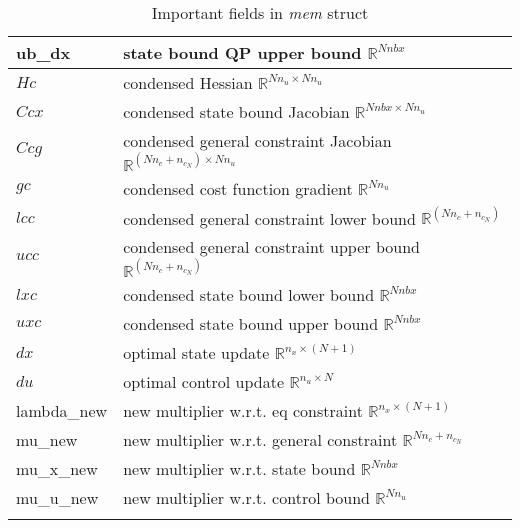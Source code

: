 \documentclass{article}
\newcommand{\alert}[1]{{\textit{#1}}}
\begin{document}
\begin{longtable}{l|l}
		ub\_dx & state bound QP upper bound     $\mathbb{R}^{Nnbx}$           \\\hline
		$Hc$ & condensed Hessian    $\mathbb{R}^{Nn_u\times Nn_u}$                     \\
		$Ccx$ & condensed state bound Jacobian  $\mathbb{R}^{Nnbx\times Nn_u}$          \\
		$Ccg$ & condensed general constraint Jacobian  $\mathbb{R}^{(Nn_c+n_{c_N})\times Nn_u}$    \\
		$gc$ & condensed cost function gradient  $\mathbb{R}^{Nn_u}$        \\
		$lcc$ & condensed general constraint lower bound $\mathbb{R}^{(Nn_c+n_{c_N})}$ \\
		$ucc$ & condensed general constraint upper bound $\mathbb{R}^{(Nn_c+n_{c_N})}$ \\
		$lxc$ & condensed state bound lower bound   $\mathbb{R}^{Nnbx}$      \\
		$uxc$ & condensed state bound upper bound   $\mathbb{R}^{Nnbx}$      \\\hline
		$dx$ & optimal state update     $\mathbb{R}^{n_x\times (N+1)}$                 \\
		$du$ & optimal control update   $\mathbb{R}^{n_u\times N}$                 \\
		lambda\_new & new multiplier w.r.t. eq constraint $\mathbb{R}^{n_x\times (N+1)}$      \\
		mu\_new & new multiplier w.r.t. general constraint  $\mathbb{R}^{Nn_c+n_{c_N}}$ \\
		mu\_x\_new & new multiplier w.r.t. state bound  $\mathbb{R}^{Nnbx}$       \\
		mu\_u\_new & new multiplier w.r.t. control bound  $\mathbb{R}^{Nn_u}$     \\
		\hline
	\caption{Important fields in \alert{mem} struct}
	\label{table:mem}
\end{longtable}
\end{document}
